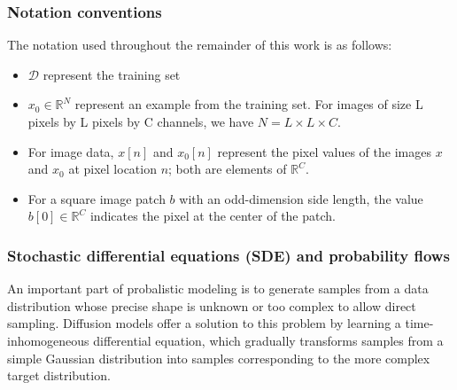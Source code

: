 \documentclass[a4paper,10pt]{article}
\theoremstyle{definition} %
\theoremstyle{definition} %
\theoremstyle{definition} %
\theoremstyle{definition} %
\newcommand{\R}{\mathbb{R}}
\newcommand{\0}{\boldsymbol{0}}
\newcommand{\D}{\mathcal{D}}
\begin{document}
\subsubsection{Notation conventions}
The notation used throughout the remainder of this work is as follows:
\begin{itemize}
    \item[] $\D$ represent the training set
    \item[] $x_0\in\R^N$ represent an example from the training set. For images of size L pixels by L pixels by C channels, we have $N=L\times L \times C$.
    \item[] For image data, $x[n]$ and $x_0[n]$ represent the pixel values of the images $x$ and $x_0$ at pixel location $n$; both are elements of $\R^C$.
    \item[] For a square image patch $b$ with an odd-dimension side length, the value $b[0] \in \R^C$ indicates the pixel at the center of the patch.
\end{itemize}
\subsubsection{Stochastic differential equations (SDE) and probability flows}

An important part of probalistic modeling is to generate samples from a data distribution whose precise shape is unknown or too complex to allow direct sampling. Diffusion models offer a solution to this problem by learning a time-inhomogeneous differential equation, which gradually transforms samples from a simple Gaussian distribution into samples corresponding to the more complex target distribution.
\end{document}

